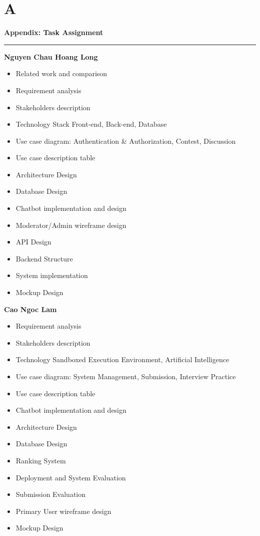 \vspace{2cm}

\renewcommand{\thesection}{A}

\section*{A}

\doublespacing

\noindent \textbf{\Huge Appendix: Task Assignment} 

\noindent\rule{\textwidth}{0.4pt}

\noindent
\textbf{Nguyen Chau Hoang Long }
\begin{itemize}
    \item Related work and comparison
    \item Requirement analysis
    \item Stakeholders description
    \item Technology Stack Front-end, Back-end, Database
    \item Use case diagram: Authentication \& Authorization, Contest, Discussion
    \item Use case description table
    \item Architecture Design
    \item Database Design
    \item Chatbot implementation and design 
    \item Moderator/Admin wireframe design
    \item API Design
    \item Backend Structure
    \item System implementation
    \item Mockup Design
\end{itemize}

\noindent
\textbf{Cao Ngoc Lam }
\begin{itemize}
    \item Requirement analysis
    \item Stakeholders description
    \item Technology Sandboxed Execution Environment, Artificial Intelligence
    \item Use case diagram:  System Management, Submission, Interview Practice
    \item Use case description table
    \item Chatbot implementation and design 
    \item Architecture Design
    \item Database Design
    \item Ranking System
    \item Deployment and System Evaluation
    \item Submission Evaluation
    \item Primary User wireframe design
    \item Mockup Design
\end{itemize}

